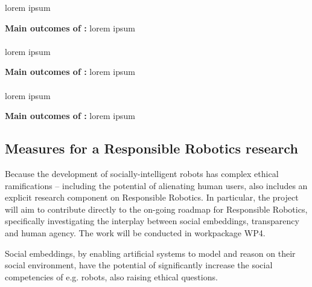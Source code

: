 lorem ipsum

\begin{framed}
    {\noindent\bf Main outcomes of \tZA:} lorem ipsum 
\end{framed}

\paragraph{\TZB}

lorem ipsum

\begin{framed}
    {\noindent\bf Main outcomes of \tZB:} lorem ipsum 
\end{framed}

\paragraph{\TZC}

lorem ipsum

\begin{framed}
    {\noindent\bf Main outcomes of \tZC:} lorem ipsum 
\end{framed}




\subsection{Measures for a Responsible Robotics research}


Because the development of socially-intelligent robots has
complex ethical ramifications -- including the potential of alienating
human users, \project also includes an explicit research component on
Responsible Robotics. In particular, the project will aim to contribute directly
to the on-going roadmap for Responsible Robotics, specifically
investigating the interplay between social embeddings, transparency and human
agency. The work will be conducted in workpackage WP4.


Social embeddings, by enabling artificial systems to model and reason on their
social environment, have the potential of significantly increase the social
competencies of e.g. robots, also raising ethical questions.

